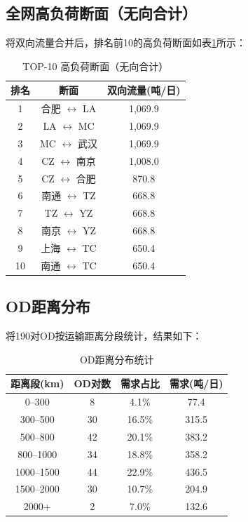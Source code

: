 \documentclass[12pt,a4paper,fontset=none]{ctexart}
\begin{document}
\subsection{全网高负荷断面（无向合计）}

将双向流量合并后，排名前10的高负荷断面如表\ref{tab:undirected}所示：

\begin{table}[H]
\centering
\caption{TOP-10 高负荷断面（无向合计）}
\label{tab:undirected}
\begin{tabular}{ccc}
\toprule
\textbf{排名} & \textbf{断面} & \textbf{双向流量(吨/日)} \\
\midrule
1 & 合肥 $\leftrightarrow$ LA & 1,069.9 \\
2 & LA $\leftrightarrow$ MC & 1,069.9 \\
3 & MC $\leftrightarrow$ 武汉 & 1,069.9 \\
4 & CZ $\leftrightarrow$ 南京 & 1,008.0 \\
5 & CZ $\leftrightarrow$ 合肥 & 870.8 \\
6 & 南通 $\leftrightarrow$ TZ & 668.8 \\
7 & TZ $\leftrightarrow$ YZ & 668.8 \\
8 & 南京 $\leftrightarrow$ YZ & 668.8 \\
9 & 上海 $\leftrightarrow$ TC & 650.4 \\
10 & 南通 $\leftrightarrow$ TC & 650.4 \\
\bottomrule
\end{tabular}
\end{table}

\subsection{OD距离分布}

将190对OD按运输距离分段统计，结果如下：

\begin{table}[H]
\centering
\caption{OD距离分布统计}
\begin{tabular}{cccc}
\toprule
\textbf{距离段(km)} & \textbf{OD对数} & \textbf{需求占比} & \textbf{需求(吨/日)} \\
\midrule
0--300   &  8  &  4.1\% &  77.4 \\
300--500 & 30  & 16.5\% & 315.5 \\
500--800 & 42  & 20.1\% & 383.2 \\
800--1000& 34  & 18.8\% & 358.2 \\
1000--1500&44  & 22.9\% & 436.5 \\
1500--2000&30  & 10.7\% & 204.9 \\
2000+    &  2  &  7.0\% & 132.6 \\
\bottomrule
\end{tabular}
\end{table}
\end{document}
